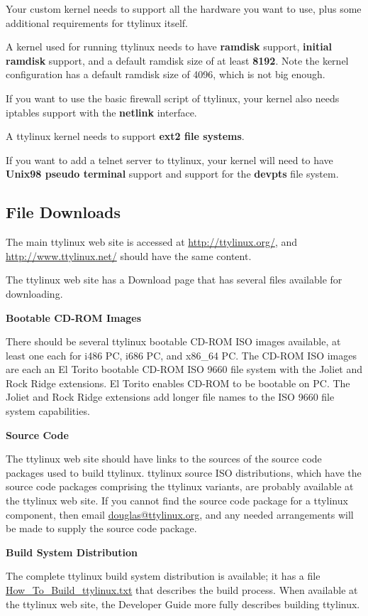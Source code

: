 \documentclass[10pt]{article}
\begin{document}
Your custom kernel needs to support all the hardware you want to use, plus some
additional requirements for ttylinux itself.

A kernel used for running ttylinux needs to have {\bf ramdisk} support, {\bf
initial ramdisk} support, and a default ramdisk size of at least {\bf 8192}.
Note the kernel configuration has a default ramdisk size of 4096, which is not
big enough.

If you want to use the basic firewall script of ttylinux, your kernel also
needs iptables support with the {\bf netlink} interface.

A ttylinux kernel needs to support {\bf ext2 file systems}.

If you want to add a telnet server to ttylinux, your kernel will need to have
{\bf Unix98 pseudo terminal} support and support for the {\bf devpts} file
system.

\subsection{File Downloads}

The main ttylinux web site is accessed at \url{http://ttylinux.org/}, and
\url{http://www.ttylinux.net/} should have the same content.

The ttylinux web site has a Download page that has several files available for
downloading.

{\bf Bootable CD-ROM Images}

There should be several ttylinux bootable CD-ROM ISO images available, at least
one each for i486 PC, i686 PC, and x86\_64 PC. The CD-ROM ISO images are each
an El Torito bootable CD-ROM ISO 9660 file system with the Joliet and Rock
Ridge extensions. El Torito enables CD-ROM to be bootable on PC. The Joliet and
Rock Ridge extensions add longer file names to the ISO 9660 file system
capabilities.

{\bf Source Code}

The ttylinux web site should have links to the sources of the source code
packages used to build ttylinux. ttylinux source ISO distributions, which have
the source code packages comprising the ttylinux variants, are probably
available at the ttylinux web site. If you cannot find the source code package
for a ttylinux component, then email \url{douglas@ttylinux.org}, and any
needed arrangements will be made to supply the source code package.

{\bf Build System Distribution}

The complete ttylinux build system distribution is available; it has a file
\url{How_To_Build_ttylinux.txt} that describes the build process. When
available at the ttylinux web site, the Developer Guide more fully describes
building ttylinux.
\end{document}
